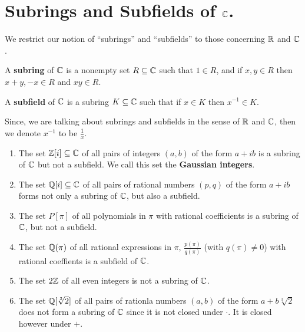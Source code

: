 
\section{Subrings and Subfields of $\mathbb{C}$.}
\label{section2}

We restrict our notion of ``subrings'' and ``subfields'' to those concerning 
$\mathbb{R}$ and  $\mathbb{C}$.

\begin{definition}
    A \textbf{subring} of $\mathbb{C}$ is a nonempty set  $R \subseteq \mathbb{C}$ such that 
    $1 \in R$, and if  $x,y \in R$ then  $x+y,-x \in R$ and  $xy \in R$.
\end{definition}

\begin{definition}
    A \textbf{subfield} of $\mathbb{C}$ is a subring  $K \subseteq \mathbb{C}$ such that if $x \in K$ 
    then $x^{-1} \in K$.
\end{definition}

Since, we are talking about subrings and subfields in the sense of  $\mathbb{R}$ and  $\mathbb{C}$, 
then we denote  $x^{-1}$ to be $\frac{1}{x}$.

\begin{example}
    \begin{enumerate}[label=(\arabic*)]
        \item The set $\mathbb{Z}[i] \subseteq \mathbb{C}$ of all pairs of integers $(a,b)$ of 
            the form  $a+ib$ is a subring of  $\mathbb{C}$ but not a subfield. We call 
            this set the \textbf{Gaussian integers}.

        \item The set $\mathbb{Q}[i] \subseteq \mathbb{C}$ of all pairs of rational numbers $(p,q)$ 
            of the form  $a+ib$ forms not only a subring of  $\mathbb{C}$, but also a 
            subfield.

        \item The set  $P[\pi]$ of all polynomials in  $\pi$ with rational 
            coefficients is a subring of  $\mathbb{C}$, but not a subfield.

        \item The set  $\mathbb{Q}(\pi)$ of all rational expressions in  $\pi$, $ 
            \frac{p(\pi)}{q(\pi)}$ (with $q(\pi) \neq 0$) with rational coeffients 
            is a subfield of $\mathbb{C}$.

        \item The set  $2\mathbb{Z}$ of all even integers is not a subring of  $\mathbb{C}$.

        \item The set  $\mathbb{Q}[\sqrt[3]{2}]$ of all pairs of rationla numbers $(a,b)$ 
            of the form  $a+b\sqrt[3]{2}$ does not form a subring of $\mathbb{C}$ since 
            it is not closed under  $\cdot$. It is closed however under  $+$.
    \end{enumerate}
\end{example} 

